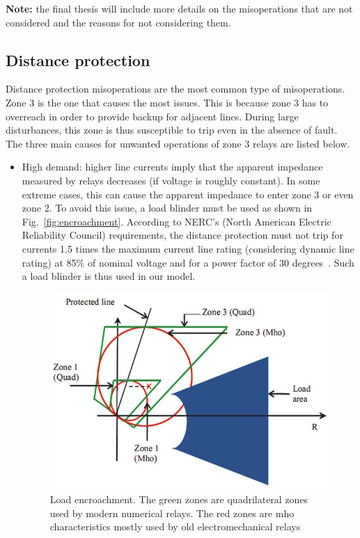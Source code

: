 \textbf{Note:} the final thesis will include more details on the misoperations that are not considered and the reasons for not considering them.

\subsection{Distance protection}

Distance protection misoperations are the most common type of misoperations. Zone 3 is the one that causes the most issues. This is because zone 3 has to overreach in order to provide backup for adjacent lines. During large disturbances, this zone is thus susceptible to trip even in the absence of fault. The three main causes for unwanted operations of zone 3 relays are listed below.

\begin{itemize}
    \item High demand: higher line currents imply that the apparent impedance measured by relays decreases (if voltage is roughly constant). In some extreme cases, this can cause the apparent impedance to enter zone 3 or even zone 2. To avoid this issue, a load blinder must be used as shown in Fig.~\ref{fig:encroachment}. According to NERC's (North American Electric Reliability Council) requirements, the distance protection must not trip for currents 1.5 times the maximum current line rating (considering dynamic line rating) at 85\% of nominal voltage and for a power factor of 30 degrees~\cite{PSRCreportProtectionMisop}. Such a load blinder is thus used in our model.
\begin{figure}
    \centering
    \includegraphics[width=0.8\linewidth]{Figs/LoadEncroachment.jpg}
    \caption{Load encroachment. The green zones are quadrilateral zones used by modern numerical relays. The red zones are mho characteristics mostly used by old electromechanical relays~\cite{LoadEncroachmentFig}}

\end{figure}
\end{itemize}
